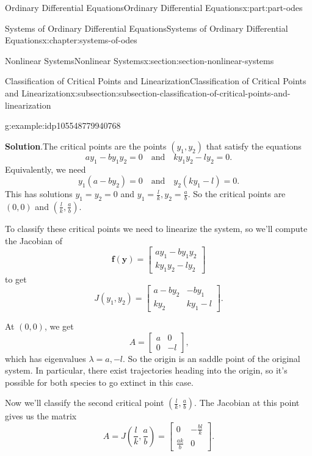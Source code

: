 \documentclass[oneside,10pt,]{book}
\newcommand{\blocktitlefont}{\relax}
\numberwithin{equation}{part}
\renewcommand{\vec}[1]{\mathbf{#1}}
\newcommand{\amp}{&}
\begin{document}
\begin{partptx}{Ordinary Differential Equations}{}{Ordinary Differential Equations}{}{}{x:part:part-odes}
\begin{chapterptx}{Systems of Ordinary Differential Equations}{}{Systems of Ordinary Differential Equations}{}{}{x:chapter:systems-of-odes}
\begin{sectionptx}{Nonlinear Systems}{}{Nonlinear Systems}{}{}{x:section:section-nonlinear-systems}
\begin{subsectionptx}{Classification of Critical Points and Linearization}{}{Classification of Critical Points and Linearization}{}{}{x:subsection:subsection-classification-of-critical-points-and-linearization}
\begin{example}{}{g:example:idp105548779940768}
\par\smallskip%
\noindent\textbf{\blocktitlefont Solution}.\hypertarget{g:solution:idp105548779943968}{}\quad{}The critical points are the points \((y_{1},y_{2})\) that satisfy the equations%
\begin{equation*}
ay_{1}-by_{1}y_{2} = 0\quad\text{and}\quad ky_{1}y_{2} - ly_{2} = 0.
\end{equation*}
Equivalently, we need%
\begin{equation*}
y_{1}(a-by_{2}) = 0\quad\text{and}\quad y_{2}(ky_{1}-l) = 0.
\end{equation*}
This has solutions \(y_{1} = y_{2} = 0\) and \(y_{1} = \frac{l}{k},y_{2} = \frac{a}{b}\). So the critical points are \((0,0)\) and \((\frac{l}{k},\frac{a}{b})\).%
\par
To classify these critical points we need to linearize the system, so we'll compute the Jacobian of%
\begin{equation*}
\vec{f}(\vec{y}) = \begin{bmatrix}ay_{1}-by_{1}y_{2} \\ ky_{1}y_{2} - ly_{2}\end{bmatrix}
\end{equation*}
to get%
\begin{equation*}
J(y_{1},y_{2}) = \begin{bmatrix}a-by_{2} \amp  -by_{1} \\ ky_{2} \amp  ky_{1} - l\end{bmatrix}.
\end{equation*}
%
\par
At \((0,0)\), we get%
\begin{equation*}
A = \begin{bmatrix}a \amp  0 \\ 0 \amp  -l\end{bmatrix}\text{,}
\end{equation*}
which has eigenvalues \(\lambda=a,-l\). So the origin is an saddle point of the original system. In particular, there exist trajectories heading into the origin, so it's possible for both species to go extinct in this case.%
\par
Now we'll classify the second critical point \((\frac{l}{k},\frac{a}{b})\). The Jacobian at this point gives us the matrix%
\begin{equation*}
A = J(\frac{l}{k},\frac{a}{b}) = \begin{bmatrix}0 \amp  -\frac{bl}{k} \\ \frac{ak}{b} \amp  0\end{bmatrix}\text{.}

\end{equation*}
\end{example}
\end{subsectionptx}
\end{sectionptx}
\end{chapterptx}
\end{partptx}
\end{document}

